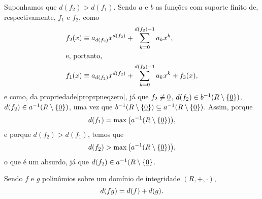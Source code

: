 \begin{dem}
  Suponhamos que $d(f_2)>d(f_1)$. Sendo $a$ e
  $b$ as funções com suporte finito de, respectivamente, $f_1$ e
  $f_2$, como
  \begin{align*}
      f_2(x) &\equiv
        a_{d(f_2)}x^{d(f_2)}+\sum_{k=0}^{d(f_2)-1}a_kx^k\mathrm{,}\\
      \intertext{e, portanto,}
      f_1(x) &\equiv
        a_{d(f_2)}x^{d(f_2)}+\sum_{k=0}^{d(f_2)-1}a_kx^k+f_3(x)\mathrm{,}
  \end{align*}
  e como, da propriedade\xspace\ref{proprpneqzero},
  já que $f_2\not\equiv\underline{0}$,
  $d(f_2)\in b^{-1}(R\setminus\left\{ \underline{0} \right\})$, $d(f_2)\in
  a^{-1}(R\setminus\left\{ \underline{0} \right\})$, uma vez que
  $b^{-1}(R\setminus\left\{ \underline{0} \right\})\subseteq
  a^{-1}(R\setminus\left\{ \underline{0} \right\})$. Assim, porque
  \begin{equation*}
    d(f_1)=\max{\bigl(a^{-1}(R\setminus\left\{ \underline{0}\right\})\bigr)}\mathrm{,}
  \end{equation*}
  e porque $d(f_2)>d(f_1)$, temos que
  \begin{equation*}
    d(f_2)>\max{\bigl(a^{-1}(R\setminus\left\{ \underline{0}\right\})\bigr)}\mathrm{,}
  \end{equation*}
  o que é um absurdo, já que $d(f_2)\in a^{-1}(R\setminus\left\{ \underline{0} \right\}$.
\end{dem}

\begin{Lem}\label{lemgrauvezes}
  Sendo $f$ e $g$ polinômios sobre um domínio de integridade
  $(R,+,\cdot)$,
  \begin{equation*}
    d(fg) = d(f)+d(g)\mathrm{.}
  \end{equation*}
\end{Lem}

